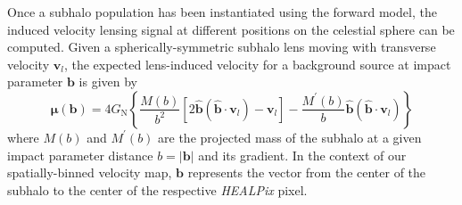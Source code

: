 \documentclass[twocolumn]{aastex631}
\newcommand{\package}[1]{\textsl{#1}\xspace}
\newcommand{\healpix}{\package{HEALPix}}
\begin{document}
{Once a subhalo population has been instantiated using the forward model, the induced velocity lensing signal at different positions on the celestial sphere can be computed.} Given a spherically-symmetric subhalo lens moving with transverse velocity $\mathbf{v}_{l}$, the expected lens-induced velocity for a {background source} at impact parameter $\mathbf{b}$ is given by~\citep{VanTilburg:2018ykj}
\begin{equation}
\boldsymbol{\mu}(\mathbf{b})=4 G_{\mathrm{N}}\left\{\frac{M(b)}{b^{2}}\left[2 \hat{\mathbf{b}}\left(\hat{\mathbf{b}} \cdot \mathbf{v}_{l}\right)-\mathbf{v}_{l}\right]-\frac{M^{\prime}(b)}{b} \hat{\mathbf{b}}\left(\hat{\mathbf{b}} \cdot \mathbf{v}_{l}\right)\right\}
\end{equation}
where $M(b)$ and $M^{\prime}(b)$ are the projected mass of the subhalo at a given impact parameter distance $b = |\mathbf{b}|$ and its gradient. {In the context of our spatially-binned velocity map, $\mathbf{b}$ represents the vector from the center of the subhalo to the center of the respective \healpix pixel.}



\end{document}
